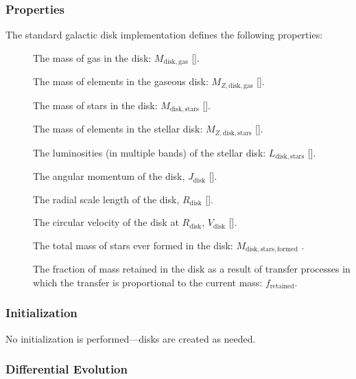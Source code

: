 \subsubsection{Properties}

The standard galactic disk implementation defines the following properties:
\begin{description}
 \item [] The mass of gas in the disk: $M_\mathrm{disk, gas}$ [].
 \item [] The mass of elements in the gaseous disk: $M_{Z, \mathrm{disk, gas}}$ [].
 \item [] The mass of stars in the disk: $M_\mathrm{disk, stars}$ [].
 \item [] The mass of elements in the stellar disk: $M_{Z, \mathrm{disk, stars}}$ [].
 \item [] The luminosities (in multiple bands) of the stellar disk: $L_\mathrm{disk, stars}$ [].
 \item [] The angular momentum of the disk, $J_\mathrm{disk}$ [].
 \item [] The radial scale length of the disk, $R_\mathrm{disk}$ [].
 \item [] The circular velocity of the disk at $R_\mathrm{disk}$, $V_\mathrm{disk}$ [].
 \item [] The total mass of stars ever formed in the disk: $M_\mathrm{disk, stars, formed}$ .
 \item [] The fraction of mass retained in the disk as a result of transfer processes in which the transfer is proportional to the current mass: $f_\mathrm{retained}$.
\end{description}

\subsubsection{Initialization}

No initialization is performed---disks are created as needed.

\subsubsection{Differential Evolution}

